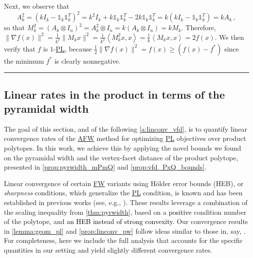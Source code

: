 \documentclass{article}
\newcommand{\ones}{\mathbb{1}}
\newcommand{\jmlrBlackBox}{\rule{1.5ex}{1.5ex}}
\newcommand{\jmlrQED}{\hfill\jmlrBlackBox\par\bigskip}
\providecommand{\proofname}{Proof}
\renewenvironment{proof}%
{%
 \par\noindent{\bfseries\upshape \proofname\ }%
}%
{\jmlrQED}
\newcommand{\innp}[1]{\left\langle #1 \right\rangle}
\newcommand{\gabrev}[1]{\textcolor{black}{#1}}
\newcommand\newlink[2]{\hyperlink{#1}{\normalcolor #2}}
\newcommand{\PL}{\newlink{def:acronym_polyak_lojasiewicz}{PL}}
\newcommand{\FW}{\newlink{def:acronym_frank_wolfe}{FW}}
\newcommand{\AFW}{\newlink{def:acronym_away_frank_wolfe}{AFW}}
\begin{document}
\begin{proof}
Next, we observe that
\[
A_k^2 = (kI_k - \ones_k \ones_k^T)^2 = k^2I_k + k\ones_k\ones_k^T - 2k\ones_k\ones_k^T = k (kI_k - \ones_k\ones_k^T) = kA_k\,,
\]
so that $M_k^2 = (A_k \otimes I_n)^2 = A_k^2 \otimes I_n = k(A_k \otimes I_n) = kM_k$.
Therefore, $\|\nabla f(x)\|^2 = \frac{1}{k^2} \|M_k x\|^2 = \frac{1}{k^2}\innp{M_k^2x, x} = \frac{1}{k}\innp{M_k x, x} = 2f(x)$.
%
We then verify that $f$ is $1$-\PL{}, because $\frac{1}{2}\|\nabla f(x)\|^2 = f(x) \geq \left( f(x) - f^\ast \right)$ since the minimum $f^\ast$ is clearly nonnegative.
\label{proof:qg_pl_intersection_k}
\end{proof}
%
%
%
%
%
%
%
%
%
%
\subsection{Linear rates in the product in terms of the pyramidal width}\label{a:linconv_pw}

The goal of this section, and of the following \cref{a:linconv_vfd}, is to quantify linear convergence rates of the \AFW{} method for optimizing \PL{} objectives over product polytopes. In this work, we achieve this by applying the novel bounds we found on the pyramidal width and the vertex-facet distance of the product polytope, presented in \cref{prop:pyrwidth_mPmQ} and \cref{prop:vfd_PxQ_bounds}.

Linear convergence of certain \FW{} variants using Hölder error bounds (HEB), or \emph{sharpness} conditions, which generalize the \PL{} condition, is known and has been established in previous works (see, e.g., \cite{BCC+23,KAP21}). %
These results leverage a combination of the scaling inequality from \cref{thm:pyrwidth}, based on a \gabrev{positive} condition number of the polytope, and
\gabrev{an HEB instead of strong convexity.}
Our convergence results in \cref{lemma:geom_pl} and \cref{prop:linconv_pw} follow ideas similar to those in, say, {\cite[Theorem 2.29, Lemma 3.32, Corollary 3.33]{BCC+23}}. For completeness, here we include the full analysis that accounts for the specific quantities in our setting and yield slightly different convergence rates.
\end{document}
